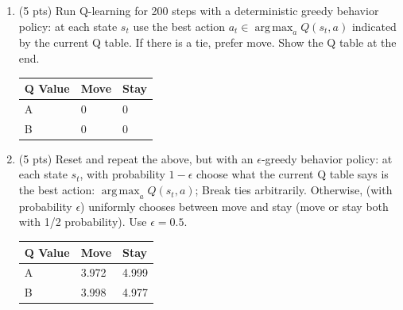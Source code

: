 \documentclass[a4paper]{article}
\theoremstyle{definition}
\DeclareMathOperator*{\argmax}{arg\,max}
\newenvironment{soln}{
    \leavevmode\color{blue}\ignorespaces
}{}
\begin{document}
\begin{enumerate}
\item (5 pts) Run Q-learning for 200 steps with a deterministic greedy behavior policy: at each state $s_t$ use the best action $a_t \in \argmax_a Q(s_t,a)$ indicated by the current Q table. If there is a tie, prefer move. Show the Q table at the end.

\begin{soln}
    \begin{center}
        \begin{tabular}{ | m{5em} | m{5em}| m{5em} |} 
          \hline
          Q Value & Move & Stay \\ 
          \hline
          A & 0 & 0  \\ 
          \hline
          B & 0 & 0\\ 
          \hline
        \end{tabular}
    \end{center}
\end{soln}

\item (5 pts) Reset and repeat the above, but with an $\epsilon$-greedy behavior policy: at each state $s_t$, with probability $1-\epsilon$ choose what the current Q table says is the best action: $\argmax_a Q(s_t,a)$; Break ties arbitrarily. Otherwise, (with probability $\epsilon$) uniformly chooses between move and stay (move or stay both with 1/2 probability). Use $\epsilon=0.5$.

\begin{soln}
    \begin{center}
            \begin{tabular}{ | m{5em} | m{5em}| m{5em} |} 
              \hline
              Q Value & Move & Stay \\ 
              \hline
              A & 3.972 & 4.999 \\ 
              \hline
              B & 3.998 & 4.977\\ 
              \hline
            \end{tabular}
        \end{center}
\end{soln}


\end{enumerate}
\end{document}
